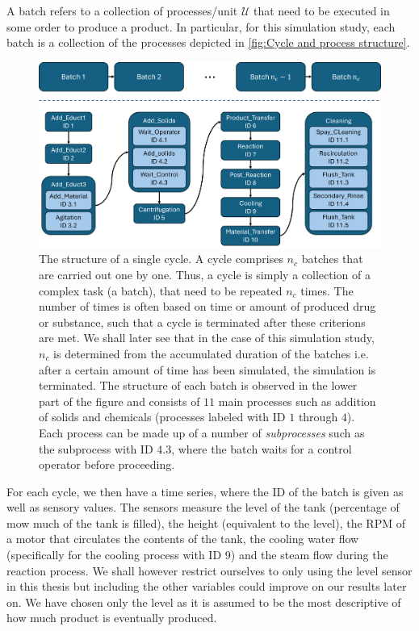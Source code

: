 \documentclass[../Thesis.tex]{subfiles}
\begin{document}
A batch refers to a collection of processes/unit $\mathcal{U}$ that need to be executed in some order to produce a product. In particular, for this simulation study, each batch is a collection of the processes depicted in \autoref{fig:Cycle and process structure}.
\begin{figure}[ht]
    \centering
    \includegraphics[width=.9\linewidth]{figures/Multiple cycles data/Cycle production layout.png}
    \caption{The structure of a single cycle. A cycle comprises $n_c$ batches that are carried out one by one. Thus, a cycle is simply a collection of a complex task (a batch), that need to be repeated $n_c$ times. The number of times is often based on time or amount of produced drug or substance, such that a cycle is terminated after these criterions are met. We shall later see that in the case of this simulation study, $n_c$ is determined from the accumulated duration of the batches i.e. after a certain amount of time has been simulated, the simulation is terminated. The structure of each batch is observed in the lower part of the figure and consists of $11$ main processes such as addition of solids and chemicals (processes labeled with ID $1$ through $4$). Each process can be made up of a number of \textit{subprocesses} such as the subprocess with ID $4.3$, where the batch waits for a control operator before proceeding.}
    \label{fig:Cycle and process structure}
\end{figure}

For each cycle, we then have a time series, where the ID of the batch is given as well as sensory values. The sensors measure the level of the tank (percentage of mow much of the tank is filled), the height (equivalent to the level), the RPM of a motor that circulates the contents of the tank, the cooling water flow (specifically for the cooling process with ID 9) and the steam flow during the reaction process. We shall however restrict ourselves to only using the level sensor in this thesis but including the other variables could improve on our results later on. We have chosen only the level as it is assumed to be the most descriptive of how much product is eventually produced.
\end{document}
